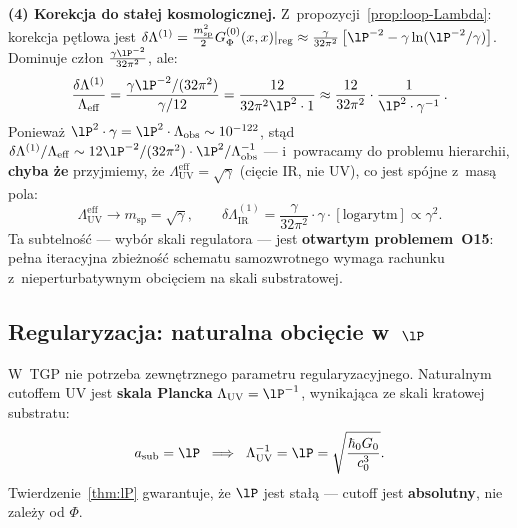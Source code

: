 \begin{proposition}
\noindent\textbf{(4) Korekcja do stałej kosmologicznej.}
Z~propozycji~\ref{prop:loop-Lambda}: korekcja pętlowa jest
$\delta\Lambda^{(1)} = \frac{m_{\mathrm{sp}}^2}{2}
G_\Phi^{(0)}(x,x)|_{\mathrm{reg}} \approx
\frac{\gamma}{32\pi^2}\left[\lP^{-2} - \gamma\ln({\lP^{-2}/\gamma})\right]$.
Dominuje człon $\frac{\gamma\lP^{-2}}{32\pi^2}$, ale:
\begin{equation}\label{eq:dLambda-ratio}
    \frac{\delta\Lambda^{(1)}}{\Lambda_{\mathrm{eff}}}
    = \frac{\gamma\lP^{-2}/(32\pi^2)}{\gamma/12}
    = \frac{12}{32\pi^2\lP^2\cdot 1}
    \approx \frac{12}{32\pi^2} \cdot \frac{1}{\lP^2\cdot\gamma^{-1}}\,.
\end{equation}
Ponieważ $\lP^2 \cdot \gamma = \lP^2 \cdot \Lambda_{\mathrm{obs}} \sim 10^{-122}$,
stąd $\delta\Lambda^{(1)}/\Lambda_{\mathrm{eff}} \sim 12\lP^{-2}/(32\pi^2) \cdot \lP^2/\Lambda_{\mathrm{obs}}^{-1}$
--- i~powracamy do problemu hierarchii, \textbf{chyba że} przyjmiemy,
że $\Lambda_{\mathrm{UV}}^{\mathrm{eff}} = \sqrt{\gamma}$ (cięcie IR,
nie UV), co jest spójne z~masą pola:
\begin{equation}\label{eq:IR-cutoff-argue}
    \Lambda_{\mathrm{UV}}^{\mathrm{eff}} \to m_{\mathrm{sp}} = \sqrt{\gamma},
    \qquad
    \delta\Lambda^{(1)}_{\mathrm{IR}}
    = \frac{\gamma}{32\pi^2}\cdot\gamma\cdot
    [\text{logarytm}] \propto \gamma^2.
\end{equation}
Ta subtelność --- wybór skali regulatora --- jest
\textbf{otwartym problemem~O15}: pełna iteracyjna zbieżność
schematu samozwrotnego wymaga rachunku z~nieperturbatywnym
obcięciem na skali substratowej.
\end{proposition}

\subsection{Regularyzacja: naturalna obcięcie w~$\lP$}%
\label{app:E-cutoff}

\begin{theorem}\label{thm:natural-cutoff}
W~TGP nie potrzeba zewnętrznego parametru regularyzacyjnego.
Naturalnym cutoffem UV jest \textbf{skala Plancka}
$\Lambda_{\mathrm{UV}} = \lP^{-1}$, wynikająca ze skali kratowej
substratu:
\begin{equation}\label{eq:UV-cutoff}
    a_{\mathrm{sub}} = \lP
    \;\;\Longrightarrow\;\;
    \Lambda_{\mathrm{UV}}^{-1} = \lP = \sqrt{\frac{\hbar_0 G_0}{c_0^3}}.
\end{equation}
Twierdzenie~\ref{thm:lP} gwarantuje, że $\lP$ jest stałą ---
cutoff jest \textbf{absolutny}, nie zależy od $\Phi$.
\end{theorem}

